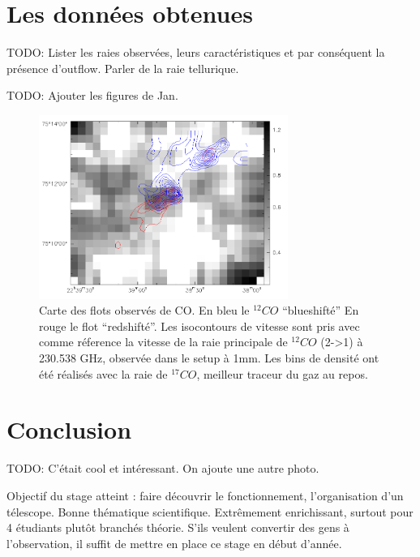 \documentclass[a4paper,10pt,french]{article}
\begin{document}
\section{Les données obtenues}

TODO: Lister les raies observées, leurs caractéristiques et par conséquent la
présence d’outflow. Parler de la raie tellurique.

TODO: Ajouter les figures de Jan.

\begin{figure}[h!]
\centering
\includegraphics[height=6cm]{figures/mapC17O.png}
\caption{Carte des flots observés de CO. En bleu le $^{12}CO$ ``blueshifté'' En rouge le flot ``redshifté''. Les isocontours de vitesse sont pris avec comme réference la vitesse de la raie principale de $^{12}CO$ (2->1) à 230.538 GHz, observée dans le setup à 1mm. Les bins de densité ont été réalisés avec la raie de $^{17}CO$, meilleur traceur du gaz au repos.}
\label{mapC17O}
\end{figure}

\section*{Conclusion}

TODO: C’était cool et intéressant. On ajoute une autre photo.

Objectif du stage atteint : faire découvrir le fonctionnement, l'organisation d'un télescope. Bonne thématique scientifique.
Extrêmement enrichissant, surtout pour 4 étudiants plutôt branchés théorie. S'ils veulent convertir des gens à l'observation, il suffit de mettre en place ce stage en début d'année.
\end{document}
